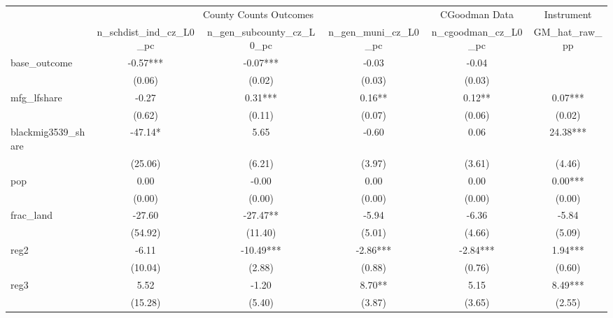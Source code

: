 {
\def\sym#1{\ifmmode^{#1}\else\(^{#1}\)\fi}
\begin{tabular}{l*{5}{c}}
\toprule
                &\multicolumn{3}{c}{County Counts Outcomes}  &\multicolumn{1}{c}{CGoodman Data}&\multicolumn{1}{c}{Instrument}\\\cmidrule(lr){2-4}\cmidrule(lr){5-5}\cmidrule(lr){6-6}
                &\multicolumn{1}{c}{n\_schdist\_ind\_cz\_L0\_pc}&\multicolumn{1}{c}{n\_gen\_subcounty\_cz\_L0\_pc}&\multicolumn{1}{c}{n\_gen\_muni\_cz\_L0\_pc}&\multicolumn{1}{c}{n\_cgoodman\_cz\_L0\_pc}&\multicolumn{1}{c}{GM\_hat\_raw\_pp}\\
\midrule
base\_outcome    &      -0.57***&      -0.07***&      -0.03   &      -0.04   &              \\
                &     (0.06)   &     (0.02)   &     (0.03)   &     (0.03)   &              \\
\addlinespace
mfg\_lfshare     &      -0.27   &       0.31***&       0.16** &       0.12** &       0.07***\\
                &     (0.62)   &     (0.11)   &     (0.07)   &     (0.06)   &     (0.02)   \\
\addlinespace
blackmig3539\_share&     -47.14*  &       5.65   &      -0.60   &       0.06   &      24.38***\\
                &    (25.06)   &     (6.21)   &     (3.97)   &     (3.61)   &     (4.46)   \\
\addlinespace
pop             &       0.00   &      -0.00   &       0.00   &       0.00   &       0.00***\\
                &     (0.00)   &     (0.00)   &     (0.00)   &     (0.00)   &     (0.00)   \\
\addlinespace
frac\_land       &     -27.60   &     -27.47** &      -5.94   &      -6.36   &      -5.84   \\
                &    (54.92)   &    (11.40)   &     (5.01)   &     (4.66)   &     (5.09)   \\
\addlinespace
reg2            &      -6.11   &     -10.49***&      -2.86***&      -2.84***&       1.94***\\
                &    (10.04)   &     (2.88)   &     (0.88)   &     (0.76)   &     (0.60)   \\
\addlinespace
reg3            &       5.52   &      -1.20   &       8.70** &       5.15   &       8.49***\\
                &    (15.28)   &     (5.40)   &     (3.87)   &     (3.65)   &     (2.55)   \\

\end{tabular}}
